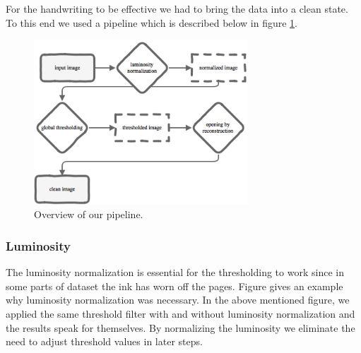 For the handwriting to be effective we had to bring the data into a clean state. To this end we used a pipeline which is described below in figure \ref{fig:pipeline}. 

\begin{figure}[ht]
\includegraphics[width=8cm]{shared/img/pipeline.png}
\caption{Overview of our pipeline.}
\label{fig:pipeline}
\end{figure}

\subsubsection{Luminosity}

The luminosity normalization is essential for the thresholding to work since in some parts of dataset the ink has worn off the pages. Figure  gives an example why luminosity normalization was necessary. In the above mentioned figure, we applied the same threshold filter with and without luminosity normalization and the results speak for themselves. By normalizing the luminosity we eliminate the need to adjust threshold values in later steps.

